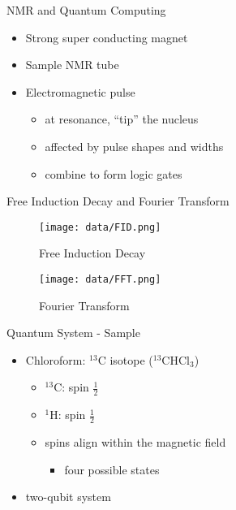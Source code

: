 \documentclass{beamer}
\begin{document}
\begin{frame}{NMR and Quantum Computing}
	\begin{itemize}
	\item Strong super conducting magnet \cite{ABC's}
	\vspace{1em}
	\item Sample NMR tube \cite{NMRprep}
	\vspace{1em}
	\item Electromagnetic pulse
	\begin{itemize}
		\item at resonance, ``tip'' the nucleus
		\item affected by pulse shapes and widths
		\item combine to form logic gates 
	\end{itemize}
	\end{itemize}
\end{frame}

\begin{frame}{Free Induction Decay and Fourier Transform}
	\begin{figure}
	\begin{minipage}[c]{.2\textwidth}
		\caption*{Free Induction Decay}
	\end{minipage}%
	\begin{minipage}[c]{.8\textwidth}
		\texttt{[image: data/FID.png]}
	\end{minipage}
	\end{figure}
	\begin{figure}
	\begin{minipage}[c]{.2\textwidth}
		\caption*{Fourier Transform}
	\end{minipage}%
	\begin{minipage}[c]{.8\textwidth}
		\texttt{[image: data/FFT.png]}
	\end{minipage}
	\end{figure}
\end{frame}

\begin{frame}{Quantum System - Sample}	
	\begin{itemize}	
	\item Chloroform: $^{13}$C isotope ($^{13}$CHCl$_{3}$)
		\begin{itemize}
		\item $^{13}$C: spin $\frac{1}{2}$
		\item $^{1}$H: spin $\frac{1}{2}$
		\vspace{1em}
		\vspace{1em}
		\item spins align within the magnetic field 
			\begin{itemize}
			\item four possible states
			\end{itemize}
		\end{itemize}
		\item two-qubit system
	\end{itemize}
\end{frame}
\end{document}
